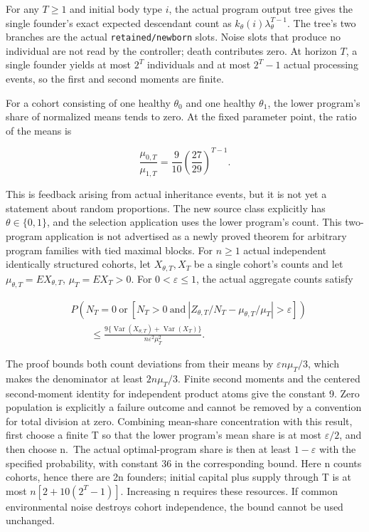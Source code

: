 \documentclass[
  english,
  11pt,
  oneside]{book}
\begin{document}
For any \(T\ge1\) and initial body type \(i\), the actual program output tree gives the single founder's exact expected descendant count as \(k_\theta(i)\lambda_\theta^{T-1}\). The tree's two branches are the actual \nolinkurl{retained/newborn} slots. Noise slots that produce no individual are not read by the controller; death contributes zero. At horizon \(T\), a single founder yields at most \(2^T\) individuals and at most \(2^T-1\) actual processing events, so the first and second moments are finite.

For a cohort consisting of one healthy \(\theta_0\) and one healthy \(\theta_1\), the lower program's share of normalized means tends to zero. At the fixed parameter point, the ratio of the means is

\[\frac{\mu_{0,T}}{\mu_{1,T}}=\frac9{10}\left(\frac{27}{29}\right)^{T-1}.\]

This is feedback arising from actual inheritance events, but it is not yet a statement about random proportions. The new source class explicitly has \(\theta\in\{0,1\}\), and the selection application uses the lower program's count. This two-program application is not advertised as a newly proved theorem for arbitrary program families with tied maximal blocks. For \(n\ge1\) actual independent identically structured cohorts, let \(X_{\theta,T},X_T\) be a single cohort's counts and let \(\mu_{\theta,T}=E X_{\theta,T}\), \(\mu_T=E X_T>0\). For \(0<\varepsilon\le1\), the actual aggregate counts satisfy

\[\begin{aligned}
&P\!\left(N_T=0\ \text{or}\ \left[N_T>0\ \text{and}\
\left|Z_{\theta,T}/N_T-\mu_{\theta,T}/\mu_T\right|>\varepsilon\right]\right)\\
&\qquad\le\frac{9\{\operatorname{Var}(X_{\theta,T})+\operatorname{Var}(X_T)\}}
{n\varepsilon^2\mu_T^2}.
\end{aligned}\]

The proof bounds both count deviations from their means by \(\varepsilon n\mu_T/3\), which makes the denominator at least \(2n\mu_T/3\). Finite second moments and the centered second-moment identity for independent product atoms give the constant 9. Zero population is explicitly a failure outcome and cannot be removed by a convention for total division at zero. Combining mean-share concentration with this result, first choose a finite T so that the lower program's mean share is at most \(\varepsilon/2\), and then choose n.~The actual optimal-program share is then at least \(1-\varepsilon\) with the specified probability, with constant 36 in the corresponding bound. Here n counts cohorts, hence there are 2n founders; initial capital plus supply through T is at most \(n[2+10(2^T-1)]\). Increasing n requires these resources. If common environmental noise destroys cohort independence, the bound cannot be used unchanged.
\end{document}
